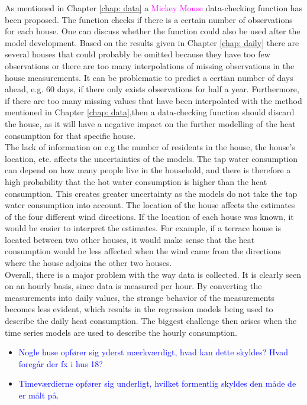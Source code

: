 \noindent As mentioned in Chapter \ref{chap: data} a \textcolor{magenta}{Mickey Mouse} data-checking function has been proposed. The function checks if there is a certain number of observations for each house. One can discuss whether the function could also be used after the model development. Based on the results given in Chapter \ref{chap: daily} there are several houses that could probably be omitted because they have too few observations or there are too many interpolations of missing observations in the house measurements. It can be problematic to predict a certian number of days ahead, e.g. 60 days, if there only exists observations for half a year. Furthermore, if there are too many missing values ​​that have been interpolated with the method mentioned in Chapter \ref{chap: data},then a data-checking function should discard the house, as it will have a negative impact on the further modelling of the heat consumption for that specific house. \\

\noindent The lack of information on e.g the number of residents in the house, the house's location, etc. affects the uncertainties of the models. The tap water consumption can depend on how many people live in the household, and there is therefore a high probability that the hot water consumption is higher than the heat consumption. This creates greater uncertainty as the models do not take the tap water consumption into account. The location of the house affects the estimates of the four different wind directions. If the location of each house was known, it would be easier to interpret the estimates. For example, if a terrace house is located between two other houses, it would make sense that the heat consumption would be less affected when the wind came from the directions where the house adjoins the other two houses. \\

\noindent Overall, there is a major problem with the way data is collected. It is clearly seen on an hourly basis, since data is measured per hour. By converting the measurements into daily values, the strange behavior of the measurements becomes less evident, which results in the regression models being used to describe the daily heat consumption. The biggest challenge then arises when the time series models are used to describe the hourly consumption.


\begin{itemize}
    \item \textcolor{blue}{Nogle huse opfører sig yderst mærkværdigt, hvad kan dette skyldes? Hvad foregår der fx i hus 18?}
    \item \textcolor{blue}{Timeværdierne opfører sig underligt, hvilket formentlig skyldes den måde de er målt på.} 
\end{itemize}

